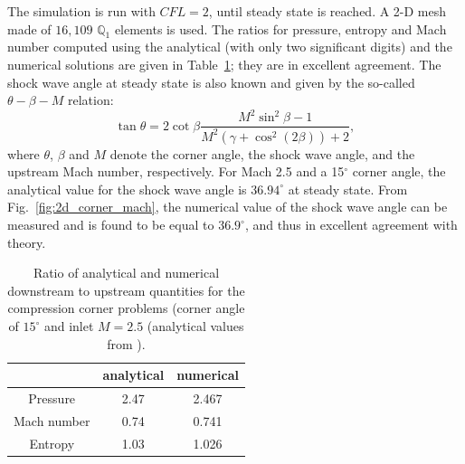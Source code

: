 \documentclass[preprint,10pt]{elsarticle}
\newcommand{\fig}[1]{Fig.~\ref{#1}}                      %
\newcommand{\tbl}[1]{Table~\ref{#1}}                     %
\begin{document}
The simulation is run with $CFL=2$, until steady state is reached. A 2-D mesh made of $16,109$ $\mathbb{Q}_1$ elements is used. The ratios for pressure, entropy and Mach number computed using the  analytical (with only two significant digits) and the numerical solutions are given in \tbl{tbl:corner_exact_sol}; they are in excellent agreement. The shock wave angle at steady state is also known and given by the so-called $\theta -\beta -M$ relation:
%
\begin{equation}
\tan \theta = 2 \cot \beta \frac{M^2 \sin^2 \beta -1}{M^2 \left(\gamma+\cos^2 (2\beta)\right)+2} ,
\end{equation}
%
where $\theta$, $\beta$ and $M$ denote the corner angle, the shock wave angle, and the upstream Mach number, respectively. For Mach 2.5 and a 15$^\circ$ corner angle, the analytical value for the shock wave angle is $36.94^{\circ}$ at steady state. From \fig{fig:2d_corner_mach}, the numerical value of the shock wave angle can be measured and is found to be equal to $36.9^{\circ}$, and thus in excellent agreement with theory.
%
\begin{table}[H]
\begin{center}
\begin{tabular}{|c|c|c|}  \hline
            & analytical & numerical\\ \hline
Pressure    & 2.47       & 2.467    \\ \hline
Mach number &  0.74      & 0.741    \\ \hline
Entropy     & 1.03       & 1.026    \\ \hline 
\end{tabular}
\caption{\label{tbl:corner_exact_sol} Ratio of analytical and numerical downstream to upstream quantities for the compression corner problems (corner angle of $15^\circ$ and inlet $M=2.5$ (analytical values from \cite{CompressionCorner}).}
\end{center}
\end{table}
%
\end{document}
